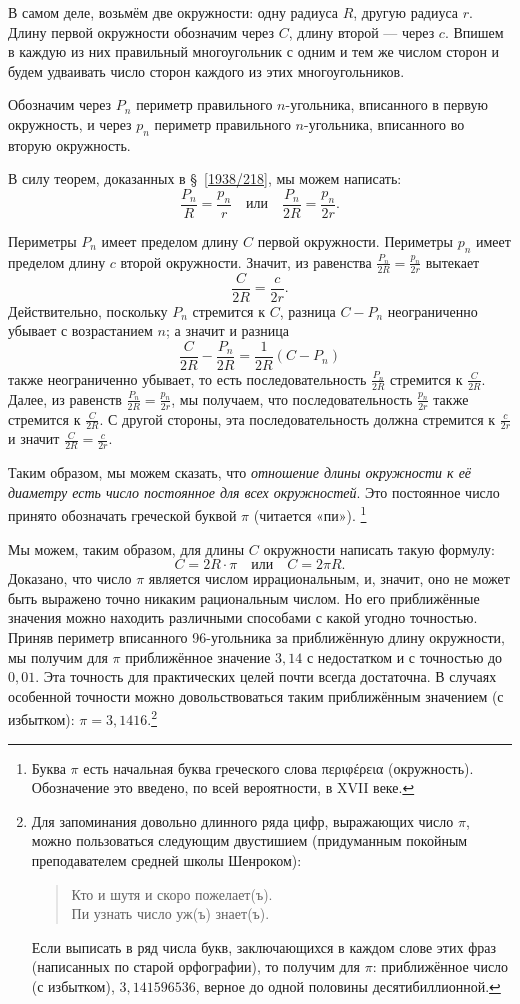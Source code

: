 \documentclass[twoside]{book}
\begin{document}
В самом деле, возьмём две окружности:
одну радиуса $R$, другую радиуса $r$.
Длину первой окружности обозначим через $C$, длину второй — через $c$.
Впишем в каждую из них правильный многоугольник с одним и тем же числом сторон и будем удваивать число сторон каждого из этих многоугольников.

Обозначим через $P_n$ периметр правильного $n$-угольника, вписанного в первую окружность, и через $p_n$ периметр правильного $n$-угольника, вписанного во вторую окружность.

В силу теорем, доказанных в §~\ref{1938/218}, мы можем написать:
\[\frac{P_n}{R}=\frac{p_n}{r}
\quad\text{или}\quad
\frac{P_n}{2R}=\frac{p_n}{2r}.\]

Периметры $P_n$ имеет пределом длину $C$ первой окружности.
Периметры $p_n$ имеет пределом длину $c$ второй окружности.
Значит, из равенства $\frac{P_n}{2R}=\frac{p_n}{2r}$ вытекает
\[\frac{C}{2R}=\frac{c}{2r}.\]
Действительно, поскольку $P_n$ стремится к $C$,
разница $C-P_n$ неограниченно убывает с возрастанием $n$;
а значит и разница
\[\frac{C}{2R}-\frac{P_n}{2R}=\frac{1}{2R}(C-P_n)\]
также неограниченно убывает, то есть последовательность $\frac{P_n}{2R}$ стремится к $\frac{C}{2R}$.
Далее, из равенств $\frac{P_n}{2R}=\frac{p_n}{2r}$,
мы получаем, что последовательность $\frac{p_n}{2r}$ также стремится к $\frac{C}{2R}$.
С другой стороны, эта последовательность должна стремится к $\frac{c}{2r}$ и значит $\frac{C}{2R}=\frac{c}{2r}$.

Таким образом, мы можем сказать, что \emph{отношение длины окружности к её диаметру есть число постоянное для всех окружностей}. 
Это постоянное число принято обозначать греческой буквой $\pi$ (читается «пи»).%
\footnote{Буква $\pi$ есть начальная буква греческого слова \textgreek{περιφέρεια} (окружность).
Обозначение это введено, по всей вероятности, в XVII веке.
}

Мы можем, таким образом, для длины $C$ окружности написать такую формулу:
\[C=2R\cdot\pi
\quad\text{или}\quad
C=2\pi R.
\]
Доказано, что число $\pi$ является числом иррациональным, и, значит, оно не может быть выражено точно никаким рациональным числом.
Но его приближённые значения можно находить различными способами с какой угодно точностью.
Приняв периметр вписанного 96-угольника за приближённую длину окружности, мы получим для $\pi$ приближённое значение $3{,}14$ с недостатком и с точностью до $0{,}01$.
Эта точность для практических целей почти всегда достаточна.
В случаях особенной точности можно довольствоваться таким приближённым значением (с избытком):
$\pi = 3{,}1416$.\footnote{Для запоминания довольно длинного ряда цифр, выражающих число $\pi$, можно пользоваться следующим  двустишием (придуманным покойным преподавателем средней школы Шенроком):
\begin{verse}
Кто и шутя и скоро пожелает(ъ).\\
Пи узнать число уж(ъ) знает(ъ).
\end{verse}
Если выписать в ряд числа букв, заключающихся в каждом слове этих фраз (написанных по старой орфографии), то получим для $\pi$:
приближённое число (с избытком), $3{,}141596536$, верное до одной половины десятибиллионной.}%
\end{document}
